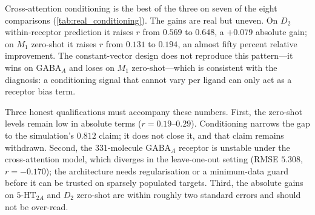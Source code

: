 \begin{table}[!ht]
\centering
\small
\caption{\textbf{Real measured effect of receptor conditioning.} Pearson $r$ under (E3) scaffold-disjoint within-receptor splits and (E4) leave-one-receptor-out. Best per row in \textbf{bold}. All values are measurements.}
\label{tab:real_conditioning}
\end{table}

Cross-attention conditioning is the best of the three on seven of the eight comparisons (\cref{tab:real_conditioning}). The gains are real but uneven. On $D_2$ within-receptor prediction it raises $r$ from $0.569$ to $0.648$, a $+0.079$ absolute gain; on $M_1$ zero-shot it raises $r$ from $0.131$ to $0.194$, an almost fifty percent relative improvement. The constant-vector design does not reproduce this pattern---it wins on GABA$_A$ and loses on $M_1$ zero-shot---which is consistent with the diagnosis: a conditioning signal that cannot vary per ligand can only act as a receptor bias term.

Three honest qualifications must accompany these numbers. First, the zero-shot levels remain low in absolute terms ($r = 0.19$--$0.29$). Conditioning narrows the gap to the simulation's $0.812$ claim; it does not close it, and that claim remains withdrawn. Second, the $331$-molecule GABA$_A$ receptor is unstable under the cross-attention model, which diverges in the leave-one-out setting (RMSE $5.308$, $r = -0.170$); the architecture needs regularisation or a minimum-data guard before it can be trusted on sparsely populated targets. Third, the absolute gains on $5\text{-HT}_{2A}$ and $D_2$ zero-shot are within roughly two standard errors and should not be over-read.

